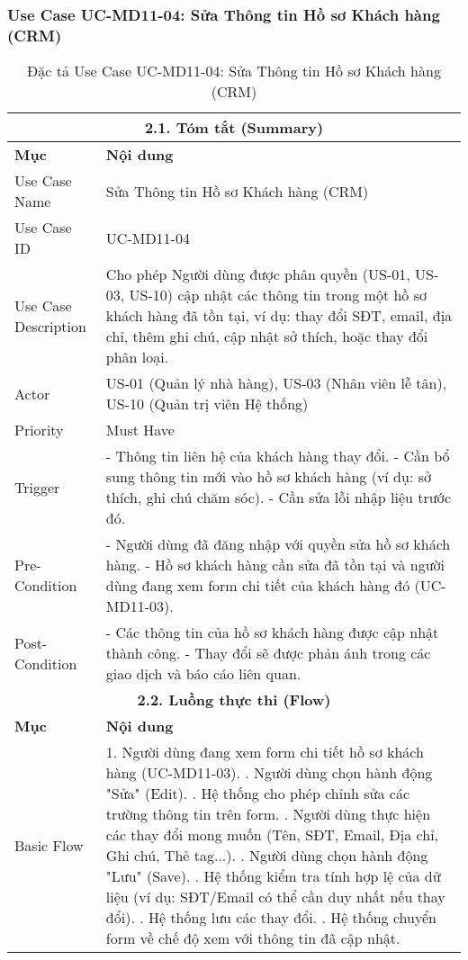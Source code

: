 \subsubsection{Use Case UC-MD11-04: Sửa Thông tin Hồ sơ Khách hàng (CRM)}
\begin{longtable}{|m{4cm}|p{11cm}|}
\caption{Đặc tả Use Case UC-MD11-04: Sửa Thông tin Hồ sơ Khách hàng (CRM)} \label{tab:uc_md11_04_edit_customer_crm} \\
\hline
\multicolumn{2}{|c|}{\textbf{2.1. Tóm tắt (Summary)}} \\
\hline
\textbf{Mục} & \textbf{Nội dung} \\
\hline
\endhead
\midrule
\endfoot
\bottomrule
\endlastfoot
Use Case Name & Sửa Thông tin Hồ sơ Khách hàng (CRM) \\
\hline
Use Case ID & UC-MD11-04 \\
\hline
Use Case Description & Cho phép Người dùng được phân quyền (US-01, US-03, US-10) cập nhật các thông tin trong một hồ sơ khách hàng đã tồn tại, ví dụ: thay đổi SĐT, email, địa chỉ, thêm ghi chú, cập nhật sở thích, hoặc thay đổi phân loại. \\
\hline
Actor & US-01 (Quản lý nhà hàng), US-03 (Nhân viên lễ tân), US-10 (Quản trị viên Hệ thống) \\
\hline
Priority & Must Have \\
\hline
Trigger & - Thông tin liên hệ của khách hàng thay đổi. \newline - Cần bổ sung thông tin mới vào hồ sơ khách hàng (ví dụ: sở thích, ghi chú chăm sóc). \newline - Cần sửa lỗi nhập liệu trước đó. \\
\hline
Pre-Condition & - Người dùng đã đăng nhập với quyền sửa hồ sơ khách hàng. \newline - Hồ sơ khách hàng cần sửa đã tồn tại và người dùng đang xem form chi tiết của khách hàng đó (UC-MD11-03). \\
\hline
Post-Condition & - Các thông tin của hồ sơ khách hàng được cập nhật thành công. \newline - Thay đổi sẽ được phản ánh trong các giao dịch và báo cáo liên quan. \\
\hline
\multicolumn{2}{|c|}{\textbf{2.2. Luồng thực thi (Flow)}} \\
\hline
\textbf{Mục} & \textbf{Nội dung} \\
\hline
Basic Flow & 1. Người dùng đang xem form chi tiết hồ sơ khách hàng (UC-MD11-03). \newline 2. Người dùng chọn hành động "Sửa" (Edit). \newline 3. Hệ thống cho phép chỉnh sửa các trường thông tin trên form. \newline 4. Người dùng thực hiện các thay đổi mong muốn (Tên, SĐT, Email, Địa chỉ, Ghi chú, Thẻ tag...). \newline 5. Người dùng chọn hành động "Lưu" (Save). \newline 6. Hệ thống kiểm tra tính hợp lệ của dữ liệu (ví dụ: SĐT/Email có thể cần duy nhất nếu thay đổi). \newline 7. Hệ thống lưu các thay đổi. \newline 8. Hệ thống chuyển form về chế độ xem với thông tin đã cập nhật. \\

\end{longtable}
